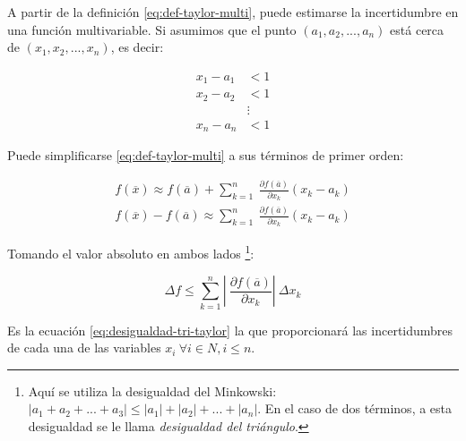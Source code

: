 A partir de la definición \ref{eq:def-taylor-multi}, puede estimarse la
incertidumbre en una función multivariable. Si asumimos que el punto $(a_1, a_2,
..., a_n)$ está cerca de $(x_1, x_2, ..., x_n)$, es decir:

\begin{align*}
    x_1 - a_1 &< 1 \\
    x_2 - a_2 &< 1 \\
              &\vdots \\
    x_n - a_n &< 1
\end{align*}

Puede simplificarse \ref{eq:def-taylor-multi} a sus términos de primer orden:

\begin{align*}
	f(\overline{x}) \approx f(\overline{a}) + \sum_{k=1}^{n} \
		\frac{\partial f(\overline{a})}{\partial x_k} (x_k - a_k) \\
	f(\overline{x}) - f(\overline{a}) \approx \sum_{k=1}^{n} \
		\frac{\partial f(\overline{a})}{\partial x_k} (x_k - a_k)
\end{align*}

Tomando el valor absoluto en ambos lados \footnote{Aquí se utiliza la
desigualdad del Minkowski: $|a_1 + a_2 + ... + a_3| \leq |a_1| + |a_2| + ... +
|a_n|$. En el caso de dos términos, a esta desigualdad se le llama
\textit{desigualdad del triángulo}.}:

\begin{equation} \label{eq:desigualdad-tri-taylor}
	\Delta f \leq \sum_{k=1}^{n} \left |\ 
		\frac{\partial f(\overline{a})}{\partial x_k} \right| \
		\Delta x_k
\end{equation}

Es la ecuación \ref{eq:desigualdad-tri-taylor} la que proporcionará las
incertidumbres de cada una de las variables $x_i\ \forall i \in N, i \leq n$.

